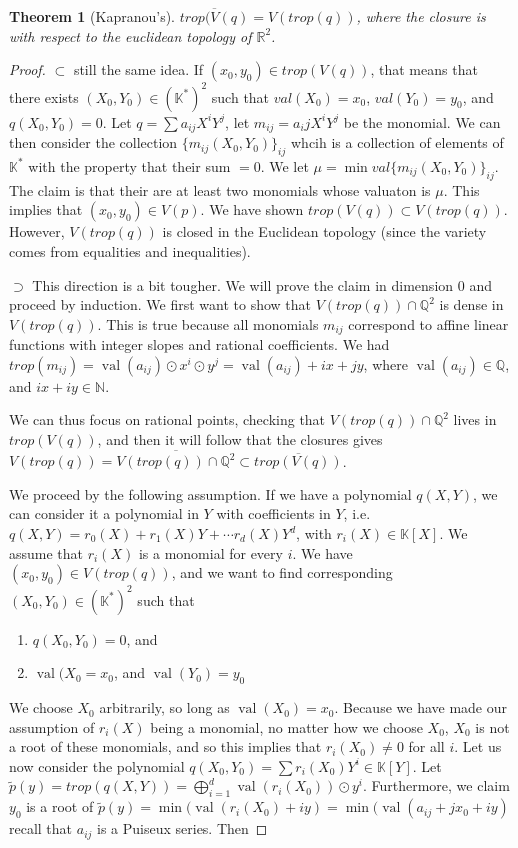\documentclass[12pt]{memoir}
\DeclareMathOperator{\val}{val}
\newtheorem{prototheorem}{Theorem}[section]
\newenvironment{theorem}
   {\begin{prototheorem}}
   {\end{prototheorem}}
\theoremstyle{definition}
\def\QQ{{\mathbb Q}}
\def\RR{{\mathbb R}}
\def\KK{{\mathbb K}}
\def\NN{{\mathbb N}}
\begin{document}
\begin{theorem}[Kapranou's]
$\overline{trop(V(q)} = V(trop(q))$, where the closure is with respect to the euclidean topology of $\RR^2$.
\end{theorem}
\begin{proof}
    $\subset$ still the same idea. If $(x_0,y_0)\in trop(V(q))$, that means that there exists $(X_0,Y_0)\in (\KK^*)^2$ such that $val(X_0)= x_0$, $val(Y_0)=y_0$, and $q(X_0,Y_0)=0$. Let $q = \sum a_{ij}X^iY^j$, let $m_{ij}=a_ijX^iY^j$ be the monomial. We can then consider the collection $\{m_{ij}(X_0,Y_0)\}_{ij}$ whcih is a collection of elements of $\KK^*$ with the property that their sum $=0$. We let $\mu= \min  val\{m_{ij}(X_0,Y_0)\}_{ij}$. The claim is that their are at least two monomials whose valuaton is $\mu$. This implies that $(x_0,y_0) \in V(p)$. We have shown $trop(V(q)) \subset V(trop(q))$. However, $V(trop(q))$ is closed in the Euclidean topology (since the variety comes from equalities and inequalities).



    $\supset$ This direction is a bit tougher. We will prove the claim in dimension $0$ and proceed by induction. We first want to show that $V(trop(q)) \cap \QQ^2$ is dense in $V(trop(q))$. This is true because all monomials $m_{ij}$ correspond to affine linear functions with integer slopes and rational coefficients. We had $trop(m_{ij})=\val(a_{ij}) \odot x^i \odot y^j= \val(a_{ij}) + ix+jy$, where $\val(a_{ij})\in \QQ$, and $ix+iy \in \NN$.


    We can thus focus on rational points, checking that $V(trop(q)) \cap \QQ^2$ lives in $trop (V(q))$, and then it will follow that the closures gives $V(trop(q)) = \overline{V(trop(q)) \cap \QQ^2} \subset \overline{trop(V(q))}$.


    We proceed by the following assumption. If we have a polynomial $q(X,Y)$, we can consider it a polynomial in $Y$ with coefficients in $Y$, i.e. $q(X,Y) = r_0(X) + r_1(X)Y + \cdots r_d(X)Y^d$, with $r_i(X) \in \KK[X]$. We assume that $r_i(X)$ is a monomial for every $i$. We have $(x_0,y_0) \in V(trop(q))$, and we want to find corresponding $(X_0,Y_0)\in (\KK^*)^2$ such that 
    \begin{enumerate}
        \item $q(X_0,Y_0)=0$, and
        \item $\val(X_0=x_0$, and $\val(Y_0)=y_0$
    \end{enumerate}

    We choose $X_0$ arbitrarily, so long as $\val(X_0)=x_0$. Because we have made our assumption of $r_i(X)$ being a monomial, no matter how we choose $X_0$, $X_0$ is not a root of these monomials, and so this implies that $r_i(X_0) \neq 0$ for all $i$. Let us now consider the polynomial $q(X_0,Y_0)= \sum r_i(X_0)Y^i \in \KK[Y]$. Let $\tilde{p}(y) = trop(q(X,Y)) = \bigoplus\limits_{i=1}^d\val(r_i(X_0))\odot y^i$. Furthermore, we claim$y_0$ is a root of $\tilde{p}(y)= \min(\val(r_i(X_0) + iy) = \min(\val(a_{ij} + jx_0 + iy)$ recall that $a_{ij}$ is a Puiseux series. Then


\end{proof}
\end{document}
